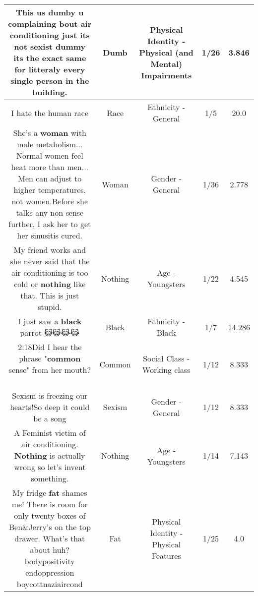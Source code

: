 \documentclass[11pt]{article}
\newlength\mylength
\begin{document}
\begin{center}
\begin{longtable}{|C{.65\mylength}|C{.30\mylength}|C{.12\mylength}|C{.12\mylength}|C{.12\mylength}|}
  \small This us \textbf{dumb}y u complaining bout air conditioning just its not sexist dummy its the exact same for litteraly every single person in the building.\normalsize   & Dumb & Physical Identity - Physical (and Mental) Impairments & 1/26 & 3.846 \\  \hline
  \small I hate the human race\normalsize   & Race & Ethnicity - General & 1/5 & 20.0 \\  \hline
  \small She's a \textbf{woman} with male metabolism... Normal women feel heat more than men... Men can adjust to higher temperatures, not women.Before she talks any non sense further, I ask her to get her sinusitis cured.\normalsize   & Woman & Gender - General & 1/36 & 2.778 \\  \hline
  \small My friend works and she never said that the air conditioning is too cold or \textbf{nothing} like that. This is just stupid.\normalsize   & Nothing & Age - Youngsters & 1/22 & 4.545 \\  \hline
  \small I just saw a \textbf{black} parrot 😸😸😹😹\normalsize   & Black & Ethnicity - Black & 1/7 & 14.286 \\  \hline
  \small 2:18Did I hear the phrase "\textbf{common} sense" from her mouth? 🤪\normalsize   & Common & Social Class - Working class & 1/12 & 8.333 \\  \hline
  \small Sexism is freezing our hearts!So deep it could be a song\normalsize   & Sexism & Gender - General & 1/12 & 8.333 \\  \hline
  \small A Feminist victim of air conditioning. \textbf{Nothing} is actually wrong so let's invent something.\normalsize   & Nothing & Age - Youngsters & 1/14 & 7.143 \\  \hline
  \small My fridge \textbf{fat} shames me! There is room for only twenty boxes of Ben\&Jerry's on the top drawer. What's that about huh?  bodypositivity endoppression boycottnaziaircond\normalsize   & Fat & Physical Identity - Physical Features & 1/25 & 4.0 \\  \hline

\end{longtable}
\end{center}
\end{document}
